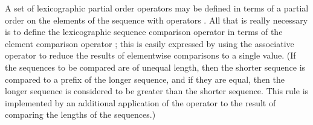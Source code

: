 A set of lexicographic partial order operators 
may be defined in terms of a partial order on the elements of the sequence with operators
.  All that is really necessary is
to define the lexicographic sequence comparison operator  in terms of the element
comparison operator ; this is easily expressed by using the
associative  operator to reduce the results of elementwise
comparisons to a single value.  (If the sequences to be compared are of unequal length,
then the shorter sequence is compared to a prefix of the longer sequence,
and if they are equal, then the longer sequence is considered to be greater than the shorter sequence.
This rule is implemented by an additional application of the  operator
to the result of comparing the lengths of the sequences.)


